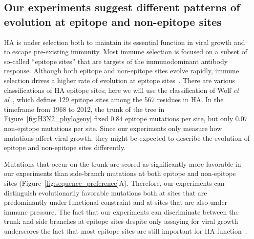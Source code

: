 \documentclass[9pt,twocolumn,twoside]{pnas-new}
\begin{document}
\subsection*{Our experiments suggest different patterns of evolution at epitope and non-epitope sites}
HA is under selection both to maintain its essential function in viral growth and to escape pre-existing immunity.
Most immune selection is focused on a subset of so-called ``epitope sites'' that are targets of the immunodominant antibody response.
Although both epitope and non-epitope sites evolve rapidly, immune selection drives a higher rate of evolution at epitope sites~\cite{fitch1991positive,wolf2006long,bhatt2011genomic}.
There are various classifications of HA epitope sites; here we will use the classification of Wolf \textit{et al}~\cite{wolf2006long}, which defines 129 epitope sites among the 567 residues in HA.
In the timeframe from 1968 to 2012, the trunk of the tree in Figure~\ref{fig:H3N2_phylogeny} fixed 0.84 epitope mutations per site, but only 0.07 non-epitope mutations per site.
Since our experiments only measure how mutations affect viral growth, they might be expected to describe the evolution of epitope and non-epitope sites differently.

Mutations that occur on the trunk are scored as significantly more favorable in our experiments than side-branch mutations at both epitope and non-epitope sites (Figure~\ref{fig:sequence_preference}A).
Therefore, our experiments can distinguish evolutionarily favorable mutations both at sites that are predominantly under functional constraint and at sites that are also under immune pressure.
The fact that our experiments can discriminate between the trunk and side branches at epitope sites despite only assaying for viral growth underscores the fact that most epitope sites are still important for HA function~\cite{nakajima2003restriction,das2013defining,koel2013substitutions}. 
\end{document}
